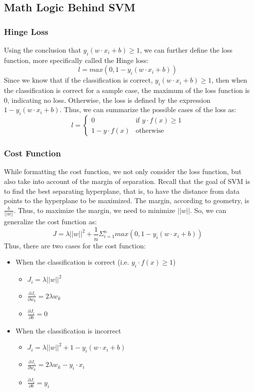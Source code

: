 \documentclass[12pt]{article}
\begin{document}
\subsection{Math Logic Behind SVM}
\subsubsection{Hinge Loss}
Using the conclusion that $y_i(w\cdot x_i + b) \geq 1$, we can further define the loss function, more specifically called the Hinge loss:
$$l = max(0, 1 - y_i(w\cdot x_i + b))$$
Since we know that if the classification is correct, $y_i(w\cdot x_i + b) \geq 1$, then when the classification is correct for a sample case, the maximum of the loss function is 0, indicating no loss. Otherwise, the loss is defined by the expression $1 - y_i(w\cdot x_i + b)$. Thus, we can summarize the possible cases of the loss as:
$$l =
\begin{cases}
0 & \text{if } y\cdot f(x) \geq 1\\
1 - y\cdot f(x) & \text{otherwise}
\end{cases}$$
\subsubsection{Cost Function}
While formatting the cost function, we not only consider the loss function, but also take into account of the margin of separation. Recall that the goal of SVM is to find the best separating hyperplane, that is, to have the distance from data points to the hyperplane to be maximized. The margin, according to geometry, is $\frac{b}{||w||}$. Thus, to maximize the margin, we need to minimize $||w||$. So, we can generalize the cost function as:
$$J = \lambda ||w||^2 + \frac{1}{n}\Sigma_{i=1}^{n}max(0, 1 - y_i(w\cdot x_i + b))$$
Thus, there are two cases for the cost function:
\begin{itemize}
\item When the classification is correct (i.e. $y_i\cdot f(x) \geq 1$)
\begin{itemize}
	\item $J_i = \lambda ||w||^2$
	\item $\frac{\partial J_i}{\partial w_k} = 2\lambda w_k$
	\item $\frac{\partial J_i}{\partial b} = 0$
\end{itemize}
\item When the classification is incorrect
\begin{itemize}
	\item $J_i = \lambda ||w||^2 + 1 - y_i(w\cdot x_i + b)$
	\item $\frac{\partial J_i}{\partial w_k} = 2\lambda w_k - y_i \cdot x_i$
	\item $\frac{\partial J_i}{\partial b} = y_i$
\end{itemize}
\end{itemize}
\end{document}
